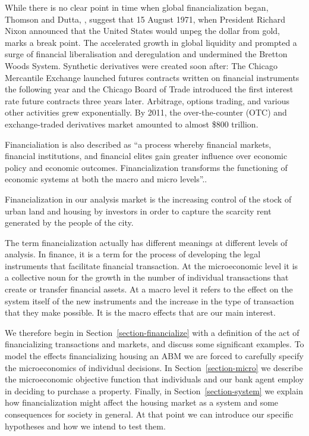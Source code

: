 While there is no clear point in time when global financialization began, Thomson and Dutta,  \cite{thomsonFinancialisationPrimer2018}, suggest that  15 August 1971, when  President Richard Nixon announced that the United States would unpeg the dollar from gold, marks a break point. The accelerated growth in global liquidity and prompted a surge of financial liberalisation and deregulation and undermined the Bretton Woods System.  Synthetic derivatives were created soon after: The Chicago Mercantile Exchange launched futures contracts written on financial instruments the following year and the Chicago Board of Trade introduced the first interest rate future contracts three years later. Arbitrage, options trading, and various other activities grew exponentially. By 2011, the over-the-counter (OTC) and exchange-traded derivatives market amounted to almost \$800 trillion.  %

Financialiation is also described as ``a process whereby financial markets, financial institutions, and financial elites gain greater influence over economic policy and economic outcomes. Financialization transforms the functioning of economic systems at both the macro and micro levels''.\cite{palleyFinancializationWhatIt2007}. 

Financialization in our analysis market is the increasing control of the stock of urban land and housing by investors in order to capture the scarcity rent generated by the people of the city.  

The term financialization actually has different meanings at different levels of analysis.  In finance, it is a term for the process of developing the legal instruments that facilitate financial transaction.  At the microeconomic level it is a collective noun for the growth in the number of individual transactions that create or transfer financial assets. At a macro level it refers to the effect on the system itself of the new instruments and the increase in the type of transaction that they make possible. It is the macro effects that are our main interest.

We therefore begin in Section~\ref{section-financialize}  with a definition of the act of financializing transactions and markets,  and discuss some significant examples. To model the effects  financializing housing   an \gls{ABM} we are forced to carefully specify the microeconomics of  individual decisions. In Section~\ref{section-micro} we describe the microeconomic objective function that individuals and our bank agent employ in deciding to purchase a property. Finally, in  Section~\ref{section-system} we explain how financialization might affect the housing market as a system and some consequences for society in general. At that point we can introduce our specific hypotheses and how we intend to test them.

